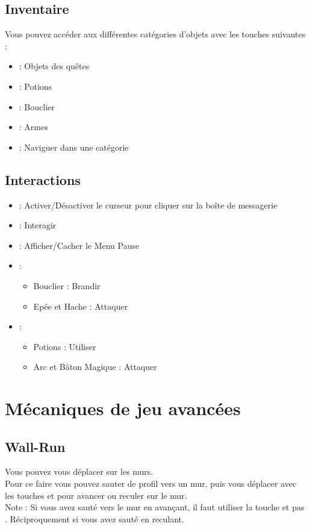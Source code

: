 \documentclass[a4paper, 11pt]{article}
\begin{document}
	\subsection{Inventaire}
	Vous pouvez accéder aux différentes catégories d'objets avec les touches suivantes : 
	\begin{itemize}
		\item {} : Objets des quêtes
		\item {} : Potions
		\item {} : Bouclier
		\item {} : Armes
		\item {} : Naviguer dans une catégorie
	\end{itemize}
	
	\subsection{Interactions}
	\begin{itemize}
		\item {} : Activer/Désactiver le curseur pour cliquer sur la boîte de messagerie
		\item {} : Interagir
		\item {} : Afficher/Cacher le Menu Pause
		\item {} :
		\begin{itemize}
			\item Bouclier : Brandir
			\item Epée et Hache : Attaquer
		\end{itemize}
		\item {} :
		\begin{itemize}
			\item Potions : Utiliser
			\item Arc et Bâton Magique : Attaquer
		\end{itemize}
	\end{itemize}
	
	\clearpage
	\section{Mécaniques de jeu avancées}
	\subsection{Wall-Run}
	Vous pouvez vous déplacer sur les murs.
	\\
	Pour ce faire vous pouvez sauter de profil vers un mur, puis vous déplacer avec les touches  et  pour avancer ou reculer sur le mur.
	\\
	Note : Si vous avez sauté vers le mur en avançant, il faut utiliser la touche  et pas . Réciproquement si vous avez sauté en reculant.
\end{document}
